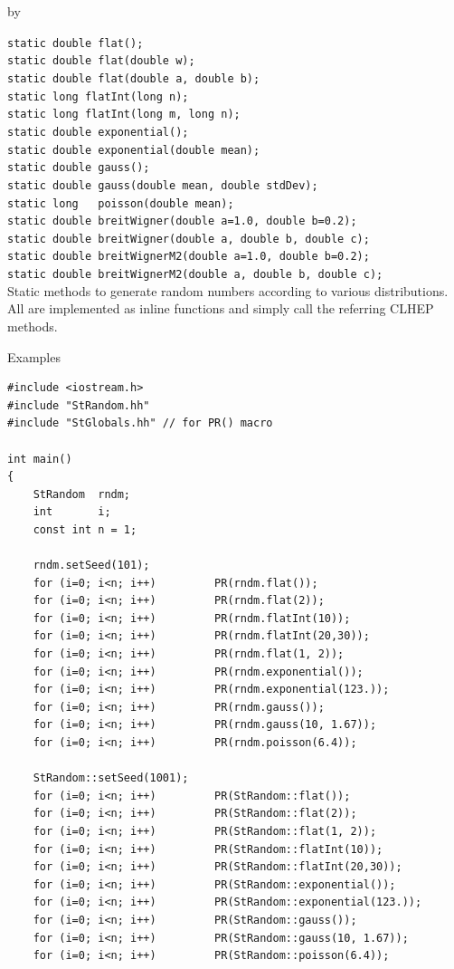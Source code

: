 \documentclass[twoside]{article}
\newcommand{\entrylabel}[1]{\mbox{\textbf{{#1}}}\hfil}%
\newenvironment{entry}
{\begin{list}{}%
    {\renewcommand{\makelabel}{\entrylabel}%
     \setlength{\labelwidth}{90pt}%
     \setlength{\leftmargin}{\labelwidth}
     \advance\leftmargin by \labelsep%
      }%
    }%
  {\end{list}}
\newcommand{\Entrylabel}[1]%
{\raisebox{0pt}[1ex][0pt]{\makebox[\labelwidth][l]%
    {\parbox[t]{\labelwidth}{\hspace{0pt}\textbf{{#1}}}}}}
\newenvironment{Entry}%
{\renewcommand{\entrylabel}{\Entrylabel}\begin{entry}}%
  {\end{entry}}
\begin{document}
\begin{Entry}
    \verb+static double flat();+ \\
    \verb+static double flat(double w);+ \\
    \verb+static double flat(double a, double b);+ \\
    \verb+static long flatInt(long n);+ \\
    \verb+static long flatInt(long m, long n);+ \\
    \verb+static double exponential();+ \\
    \verb+static double exponential(double mean);+ \\
    \verb+static double gauss();+ \\
    \verb+static double gauss(double mean, double stdDev);+ \\
    \verb+static long   poisson(double mean);+ \\
    \verb+static double breitWigner(double a=1.0, double b=0.2);+ \\
    \verb+static double breitWigner(double a, double b, double c);+ \\
    \verb+static double breitWignerM2(double a=1.0, double b=0.2);+ \\
    \verb+static double breitWignerM2(double a, double b, double c);+ \\
    Static methods to generate random numbers according to various
    distributions. All are implemented as inline functions and
    simply call the referring CLHEP methods.
    
\item[Examples]
{\footnotesize
\begin{verbatim}
#include <iostream.h>
#include "StRandom.hh"
#include "StGlobals.hh" // for PR() macro

int main()
{
    StRandom  rndm;
    int       i;
    const int n = 1;

    rndm.setSeed(101);
    for (i=0; i<n; i++)         PR(rndm.flat());
    for (i=0; i<n; i++)         PR(rndm.flat(2));
    for (i=0; i<n; i++)         PR(rndm.flatInt(10));
    for (i=0; i<n; i++)         PR(rndm.flatInt(20,30));
    for (i=0; i<n; i++)         PR(rndm.flat(1, 2));
    for (i=0; i<n; i++)         PR(rndm.exponential());
    for (i=0; i<n; i++)         PR(rndm.exponential(123.));
    for (i=0; i<n; i++)         PR(rndm.gauss());
    for (i=0; i<n; i++)         PR(rndm.gauss(10, 1.67));
    for (i=0; i<n; i++)         PR(rndm.poisson(6.4));
    
    StRandom::setSeed(1001);
    for (i=0; i<n; i++)         PR(StRandom::flat());
    for (i=0; i<n; i++)         PR(StRandom::flat(2));
    for (i=0; i<n; i++)         PR(StRandom::flat(1, 2));
    for (i=0; i<n; i++)         PR(StRandom::flatInt(10));
    for (i=0; i<n; i++)         PR(StRandom::flatInt(20,30));
    for (i=0; i<n; i++)         PR(StRandom::exponential());
    for (i=0; i<n; i++)         PR(StRandom::exponential(123.));
    for (i=0; i<n; i++)         PR(StRandom::gauss());
    for (i=0; i<n; i++)         PR(StRandom::gauss(10, 1.67));
    for (i=0; i<n; i++)         PR(StRandom::poisson(6.4));
    

\end{verbatim}}
\end{Entry}
\end{document}
